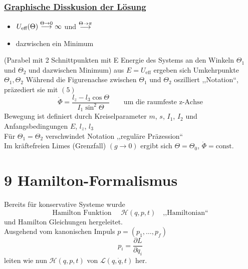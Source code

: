 \documentclass[titlepage,12pt,a4paper,ngerman]{report}
\newcommand{\tx}[1]{\textrm{#1}}
\newcommand{\lag}{\mathcal{L}}
\newcommand{\ham}{\mathcal{H}}
\newcommand{\const}{\tx{const.}}
\begin{document}
{\subsubsection{\underline{Graphische Disskusion der Lösung}}
\begin{itemize}
	\item $ U_{\tx{eff}} (\Theta) \buildrel \Theta \rightarrow 0 \over \longrightarrow \infty $ und $ \buildrel \Theta \rightarrow \pi \over \longrightarrow $
	\item dazwischen ein Minimum
\end{itemize}
(Parabel mit 2 Schnittpunkten mit E Energie des Systems an den Winkeln $ \Theta_1 $ und $ \Theta_2 $ und dazwischen Minimum)
aus $ E = U_{\tx{eff}} $ ergeben sich Umkehrpunkte $ \Theta_1, \Theta_2 $ Während die Figurenachse zwischen $ \Theta_1 $ und $ \Theta_2 $ oszilliert ,,Notation``, präzediert sie mit $ (5) $
\begin{equation*}
\dot{\Phi} = \frac{l_z - l_3 \cos \Theta}{I_1 \sin^2 \Theta} \qquad \tx{um die raumfeste z-Achse}
\end{equation*}
Bewegung ist definiert durch Kreiselparameter  $m$, $s$, $ I_1 $, $ I_2 $ und Anfangsbedingungen $ E $, $ l_z $, $ l_3 $\\
Für $ \Theta_1 = \Theta_2 $ verschwindet Notation ,,reguläre Präzession``\\
Im kräftefreien Limes (Grenzfall) $ (g\rightarrow 0) $ ergibt sich $ \Theta = \Theta_0 $, $ \dot{\Phi} = \const $\\

\section{9 Hamilton-Formalismus}
Bereits für konservative Systeme wurde\\
$$ \tx{Hamilton Funktion } \quad \ham(q,p,t) \quad \tx{,,Hamiltonian``}$$
und Hamilton Gleichungen hergeleitet.\\
Ausgehend vom kanonischen Impuls $ p = (p_1,\dots,p_f) $
\begin{equation*}
p_i = \frac{\partial L}{\partial \dot{q}_i} \tag{1}
\end{equation*}
leiten wie nun $ \ham(q,p,t) $ von $ \lag(q,\dot{q},t) $ her.
}
\end{document}
